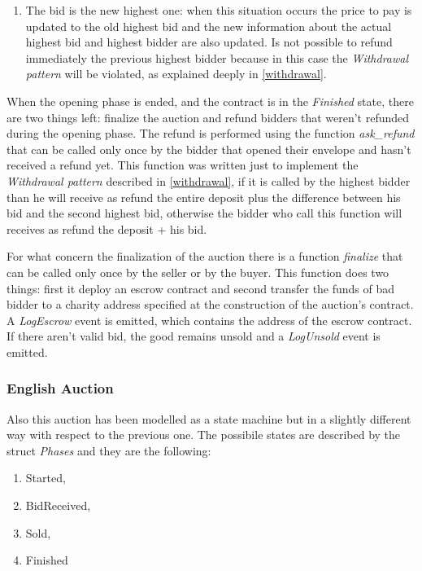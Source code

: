 \documentclass{article}
\begin{document}
\begin{enumerate}
\begin{enumerate}
        \item The bid is the new highest one: when this situation occurs the price to pay is updated to the old highest bid and the new information about the actual highest bid and highest bidder are also updated. Is not possible to refund immediately the previous highest bidder because in this case the \textit{Withdrawal pattern} will be violated, as explained deeply in \ref{withdrawal}.
    \end{enumerate}
\end{enumerate}

When the opening phase is ended, and the contract is in the \textit{Finished} state, there are two things left: finalize the auction and refund bidders that weren't refunded during the opening phase.
The refund is performed using the function \textit{ask\_refund} that can be called only once by the bidder that opened their envelope and hasn't received a refund yet. This function was written just to implement the \textit{Withdrawal pattern} described in \ref{withdrawal}, if it is called by the highest bidder than he will receive as refund the entire deposit plus the difference between his bid and the second highest bid, otherwise the bidder who call this function will receives as refund the deposit + his bid.

For what concern the finalization of the auction there is a function \textit{finalize} that can be called only once by the seller or by the buyer. This function does two things: first it deploy an escrow contract and second transfer the funds of bad bidder to a charity address specified at the construction of the auction's contract. A \textit{LogEscrow} event is emitted, which contains the address of the escrow contract. If there aren't valid bid, the good remains unsold and a \textit{LogUnsold} event is emitted.

\subsubsection{English Auction}\label{english}
Also this auction has been modelled as a state machine but in a slightly different way with respect to the previous one. The possibile states are described by the struct \textit{Phases} and they are the following:
\begin{enumerate}
    \item Started,
    \item BidReceived,
    \item Sold,
    \item Finished
\end{enumerate}
\end{document}
